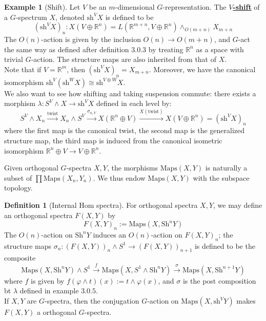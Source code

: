 \documentclass{article}
\theoremstyle{definition}
\theoremstyle{definition}
\newtheorem{definition}{Definition}[theorem]
\theoremstyle{definition}
\theoremstyle{definition}
\theoremstyle{definition}
\theoremstyle{definition}
\theoremstyle{definition}
\newtheorem{example}{Example}[theorem]
\begin{document}
\begin{tcolorbox}[colback=yellow!5!white,colframe=yellow!30!white]
\begin{example}[Shift]
    Let $V$ be an $m$-dimensional $G$-representation. The $V$\underline{\textbf{-shift}} of a $G$-spectrum $X$, denoted $\textrm{sh}^VX$ is defined to be
    \[(\textrm{sh}^VX)_n: X(V\oplus \mathbb{R}^n)=L(\mathbb{R}^{m+n}, V\oplus \mathbb{R}^n)\wedge_{O(m+n)}X_{m+n}\]
    The $O(n)$-action is given by the inclusion $O(n)\to O(m+n)$, and $G$-act the same way as defined after definition $3.0.3$ by treating $\mathbb{R}^n$ as a space with trivial $G$-action. The structure maps are also inherited from that of $X$.\\
    
    Note that if $V=\mathbb{R}^m$, then $(\textrm{sh}^VX)_n=X_{m+n}$. Moreover, we have the canonical isomorphism $\textrm{sh}^V(\textrm{sh}^WX)\cong \textrm{sh}^{V\oplus W}X$. \\

    We also want to see how shifting and taking suspension commute: there exists a morphism $\lambda: S^V\wedge X\to \textrm{sh}^VX$ defined in each level by:
    \[S^V\wedge X_n\xrightarrow{\textrm{twist}}X_n\wedge S^V\xrightarrow{\sigma_{n,V}}X(\mathbb{R}^n\oplus V)\xrightarrow{X(\textrm{twist})}X(V\oplus \mathbb{R}^n)=(\textrm{sh}^VX)_n\]
where the first map is the canonical twist, the second map is the generalized structure map, the third map is induced from the canonical isometric isomorphism $\mathbb{R}^n\oplus V\to V\oplus \mathbb{R}^n$. 



\end{example}
\end{tcolorbox}
Given orthogonal $G$-spectra $X,Y$, the morphisms $\textrm{Maps}(X,Y)$ is naturally a subset of $\prod \textrm{Maps}(X_n,Y_n)$. We thus endow $\textrm{Maps}(X,Y)$ with the subspace topology. 
\begin{tcolorbox}[colback=purple!5!white,colframe=purple!75!black]
\begin{definition}[Internal Hom spectra]
For orthogonal spectra $X,Y$, we may define an orthogonal spectra $F(X,Y)$ by 
\[F(X,Y)_n:=\textrm{Maps}(X, \textrm{Sh}^nY)\]
The $O(n)$-action on $\textrm{Sh}^nY$ induces an $O(n)$-action on $F(X,Y)_n$; the structure maps $\sigma_n: (F(X,Y))_n\wedge S^1\to (F(X,Y))_{n+1}$ is defined to be the composite
\[\textrm{Maps}(X,\textrm{Sh}^nY)\wedge S^1\xrightarrow{f} \textrm{Maps}(X,S^1\wedge \textrm{Sh}^nY)\xrightarrow{\sigma} \textrm{Maps}(X,\textrm{Sh}^{n+1}Y)\]
where $f$ is given by $f(\varphi\wedge t)(x):=t\wedge \varphi(x) $, and $\sigma$ is the post composition bt $\lambda$ defined in example $3.0.5$. \\

If $X,Y$ are $G$-spectra, then the conjugation $G$-action on $\textrm{Maps}(X,\textrm{sh}^VY)$ makes $F(X,Y)$ a orthogonal $G$-spectra. 
\end{definition}
\end{tcolorbox}
\end{document}
